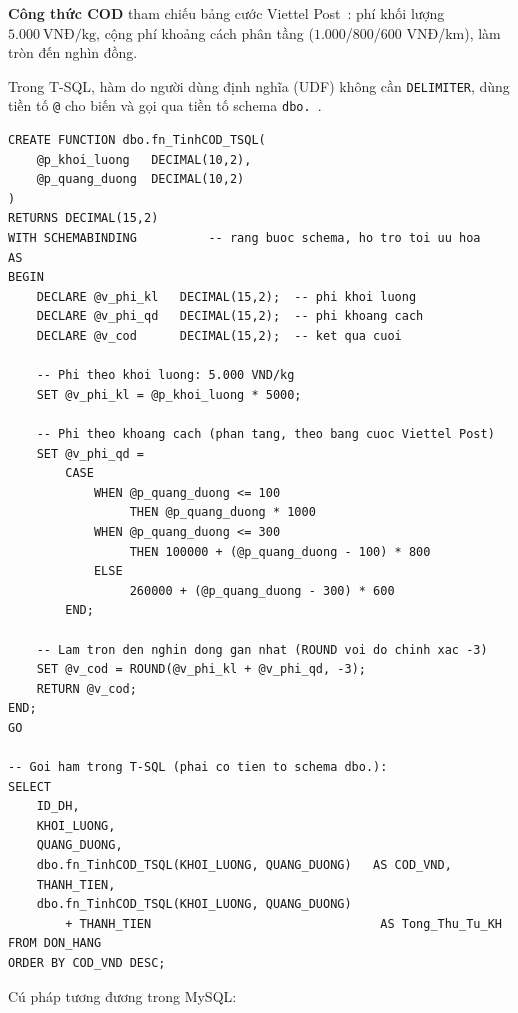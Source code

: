 \documentclass[11pt]{report}
\begin{document}
\textbf{Công thức COD} tham chiếu bảng cước Viettel Post~\cite{ViettelPostTraCuoc}: phí khối lượng $5.000\ \text{VNĐ/kg}$, cộng phí khoảng cách phân tầng ($1.000$/$800$/$600$ VNĐ/km), làm tròn đến nghìn đồng.

Trong T-SQL, hàm do người dùng định nghĩa (UDF) không cần \texttt{DELIMITER}, dùng tiền tố \texttt{@} cho biến và gọi qua tiền tố schema \texttt{dbo.}~\cite{mssql_tsql}.

\begin{verbatim}
CREATE FUNCTION dbo.fn_TinhCOD_TSQL(
    @p_khoi_luong   DECIMAL(10,2),
    @p_quang_duong  DECIMAL(10,2)
)
RETURNS DECIMAL(15,2)
WITH SCHEMABINDING          -- rang buoc schema, ho tro toi uu hoa
AS
BEGIN
    DECLARE @v_phi_kl   DECIMAL(15,2);  -- phi khoi luong
    DECLARE @v_phi_qd   DECIMAL(15,2);  -- phi khoang cach
    DECLARE @v_cod      DECIMAL(15,2);  -- ket qua cuoi

    -- Phi theo khoi luong: 5.000 VND/kg
    SET @v_phi_kl = @p_khoi_luong * 5000;

    -- Phi theo khoang cach (phan tang, theo bang cuoc Viettel Post)
    SET @v_phi_qd =
        CASE
            WHEN @p_quang_duong <= 100
                 THEN @p_quang_duong * 1000
            WHEN @p_quang_duong <= 300
                 THEN 100000 + (@p_quang_duong - 100) * 800
            ELSE
                 260000 + (@p_quang_duong - 300) * 600
        END;

    -- Lam tron den nghin dong gan nhat (ROUND voi do chinh xac -3)
    SET @v_cod = ROUND(@v_phi_kl + @v_phi_qd, -3);
    RETURN @v_cod;
END;
GO

-- Goi ham trong T-SQL (phai co tien to schema dbo.):
SELECT
    ID_DH,
    KHOI_LUONG,
    QUANG_DUONG,
    dbo.fn_TinhCOD_TSQL(KHOI_LUONG, QUANG_DUONG)   AS COD_VND,
    THANH_TIEN,
    dbo.fn_TinhCOD_TSQL(KHOI_LUONG, QUANG_DUONG)
        + THANH_TIEN                                AS Tong_Thu_Tu_KH
FROM DON_HANG
ORDER BY COD_VND DESC;
\end{verbatim}

Cú pháp tương đương trong MySQL:
\end{document}
